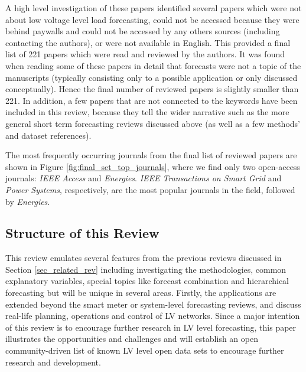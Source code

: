 A high level investigation of these papers identified several papers which were not about low voltage level load forecasting, could not be accessed because they were behind paywalls and could not be accessed by any others sources (including contacting the authors), or were not available in English. This provided a final list of 221 papers which were read and reviewed by the authors. It was found when reading some of these papers in detail that forecasts were not a topic of the manuscripts (typically consisting only to a possible application or only discussed conceptually). Hence the final number of reviewed papers is slightly smaller than 221. In addition, a few papers that are not connected to the keywords have been included in this review, because they tell the wider narrative such as the more general short term forecasting reviews discussed above (as well as a few methods' and dataset references). 

The most frequently occurring journals from the final list of reviewed papers are shown in Figure \ref{fig:final_set_top_journals}, where we find only two open-access journals: \textit{IEEE Access} and \textit{Energies}. \textit{IEEE Transactions on Smart Grid} and \textit{Power Systems}, respectively, are the most popular journals in the field, followed by \textit{Energies}.


\subsection{Structure of this Review}
This review emulates several features from the previous reviews discussed in Section \ref{sec_related_rev} including investigating the methodologies, common explanatory variables, special topics like forecast combination and hierarchical forecasting but will be unique in several areas. Firstly, the applications are extended beyond the smart meter or system-level forecasting reviews, and discuss real-life planning, operations and control of LV networks. Since a major intention of this review is to encourage further research in LV level forecasting, this paper illustrates the opportunities and challenges and will establish an open community-driven list of known LV level open data sets to encourage further research and development. 

